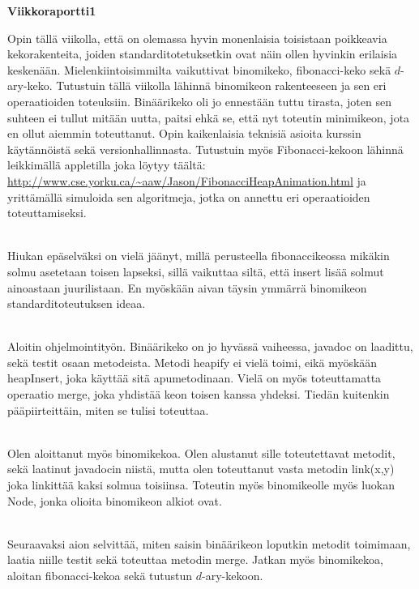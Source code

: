 \documentclass[12pt]{report}
\begin{document}
\begin{center}
\textbf{Viikkoraportti1}
\end{center}
Opin tällä viikolla, että on olemassa hyvin monenlaisia toisistaan poikkeavia kekorakenteita, joiden standarditotetuksetkin ovat näin ollen hyvinkin eri\-laisia keskenään. Mielenkiintoisimmilta vaikuttivat binomikeko, fibonacci-keko sekä $d$-ary-keko.  
Tutustuin tällä viikolla lähinnä binomikeon rakenteeseen ja sen eri operaatioiden toteuksiin. Binäärikeko oli jo ennestään tuttu tirasta, joten sen suhteen ei tullut mitään uutta, paitsi ehkä se, että nyt toteutin mi\-ni\-mi\-keon, jota en ollut aiemmin toteuttanut.
Opin kaikenlaisia teknisiä asioita kurssin käytännöistä sekä versionhallinnasta. Tutustuin myös Fibonacci-kekoon lähinnä leikkimällä appletilla joka löytyy täältä: \url{http://www.cse.yorku.ca/~aaw/Jason/FibonacciHeapAnimation.html} ja yrit\-tä\-mäl\-lä simuloida sen algoritmeja, jotka on annettu eri operaatioiden toteuttamiseksi.

\ \\
Hiukan epäselväksi on vielä jäänyt, millä perusteella fibonaccikeossa mikäkin solmu asetetaan toisen lapseksi, sillä vaikuttaa siltä, että insert lisää solmut ainoastaan juurilistaan. En myöskään aivan täysin ymmärrä binomikeon standarditoteutuksen ideaa.

\ \\
Aloitin ohjelmointityön. Binäärikeko on jo hyvässä vaiheessa, javadoc on laadittu, sekä testit osaan metodeista. Metodi heapify ei vielä toimi, eikä myöskään heapInsert, joka käyttää sitä apumetodinaan. Vielä on myös toteuttamatta operaatio merge, joka yhdistää keon toisen kanssa yhdeksi. Tie\-dän kuitenkin pääpiirteittäin, miten se tulisi toteuttaa.

\ \\
Olen aloittanut myös binomikekoa. Olen alustanut sille toteutettavat metodit, sekä laatinut javadocin niistä, mutta olen toteuttanut vasta metodin link(x,y) joka linkittää kaksi solmua toisiinsa. Toteutin myös binomikeolle myös luokan Node, jonka olioita binomikeon alkiot ovat. 

\ \\
Seuraavaksi aion selvittää, miten saisin binäärikeon loputkin metodit toi\-mi\-maan, laatia niille testit sekä toteuttaa metodin merge. Jatkan myös binomikekoa, aloitan fibonacci-kekoa sekä tutustun $d$-ary-kekoon.
\end{document}
